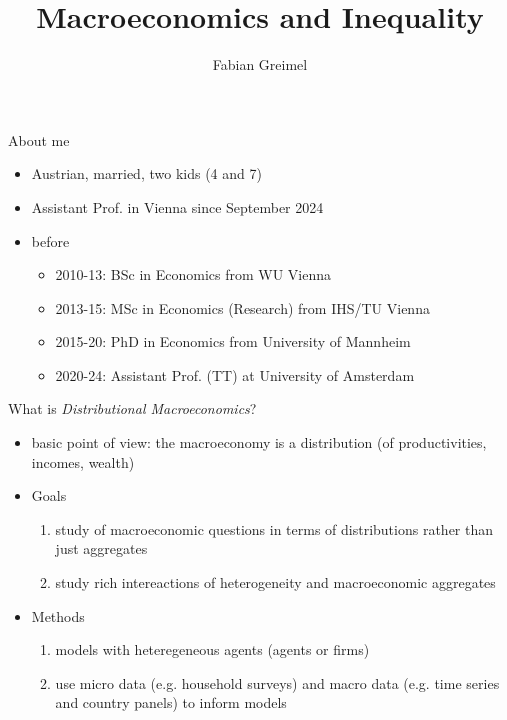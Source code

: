 \documentclass[aspectratio=169,mathserif]{beamer}
\author{Fabian Greimel}
\title{Macroeconomics and Inequality}
\begin{document}
 
\frame[plain]{\maketitle}

\begin{frame}{About me}

  \begin{itemize}
  \item Austrian, married, two kids (4 and 7)
  \item Assistant Prof. in Vienna since September 2024
  \item before
  \begin{itemize}
    \item 2010-13: BSc in Economics from WU Vienna
    \item 2013-15: MSc in Economics (Research) from IHS/TU Vienna
    \item 2015-20: PhD in Economics from University of Mannheim
    \item 2020-24: Assistant Prof. (TT) at University of Amsterdam
  \end{itemize}
\end{itemize}
\end{frame}

\begin{frame}{What is \emph{Distributional Macroeconomics}?}

  \begin{itemize}
  \item basic point of view: the \alert{macroeconomy is a distribution} (of productivities, incomes, wealth)
  \item Goals
    \begin{enumerate}
    \item study of \alert{macroeconomic questions in terms of distributions} rather than just aggregates
      
    \item study \alert{rich intereactions} of heterogeneity and macroeconomic aggregates
    \end{enumerate}
  \item Methods
    \begin{enumerate}
    \item \alert{models with heteregeneous agents} (agents or firms)
    \item use \alert{micro data} (e.g. household surveys) and \alert{macro data} (e.g. time series and country panels) to inform models
    \end{enumerate}
  \end{itemize}
\end{frame}
\end{document}
